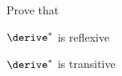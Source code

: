 Prove that
\begin{tightlist}
  \item $\derive^*$ is reflexive
  \item $\derive^*$ is transitive
\end{tightlist}

